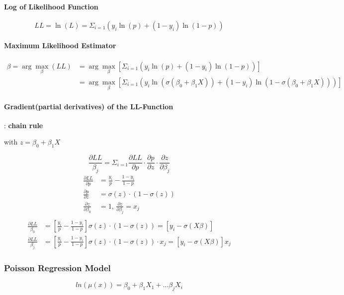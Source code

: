 \paragraph{Log of Likelihood Function}
$$LL = \ln(L) = \Sigma_{i=1} ( y_{i} \ln(p) + (1 - y_i)\ln(1-p))$$
\paragraph{Maximum Likelihood Estimator}
\begin{align*}
	\beta = \arg\max_{\beta}(LL) &= \arg\max_{\beta} [\Sigma_{i=1} ( y_{i} \ln(p) + (1 - y_i)\ln(1-p))] \\
	&= \arg\max_{\beta} [\Sigma_{i=1} ( y_{i} \ln(\sigma(\beta_0+\beta_1X)) + (1 - y_i)\ln(1-\sigma(\beta_0 + \beta_1X)))]
\end{align*}

\paragraph{Gradient(partial derivatives) of the LL-Function}: \textbf{chain rule}

with $z = \beta_0+\beta_1X$

$$\frac{\partial LL}{\beta_j} = \Sigma_{i=1} \frac{\partial LL}{\partial p} \cdot \frac{\partial p}{\partial z} \cdot \frac{\partial z}{\partial \beta_j}$$
\begin{align*}
	\frac{\partial LL}{\partial p} &= \frac{y_i}{p} - \frac{1 - y_i}{1 - p} \\
	\frac{\partial p}{\partial z} &= \sigma(z) \cdot(1 - \sigma(z)) \\
	\frac{\partial z}{\partial \beta_0} &= 1 \text{, } \frac{\partial z}{\partial \beta_j} = x_j\\		 
\end{align*}
\begin{align*}
	\frac{\partial LL}{\beta_0} &= \left[ \frac{y_i}{p} - \frac{1 - y_i}{1 - p}\right]  \sigma(z) \cdot(1 - \sigma(z)) = \left[ y_i - \sigma(X\beta) \right] \\
	\frac{\partial LL}{\beta_j} &= \left[ \frac{y_i}{p} - \frac{1 - y_i}{1 - p}\right]  \sigma(z) \cdot(1 - \sigma(z))\cdot x_j = \left[ y_i - \sigma(X\beta) \right] x_j
\end{align*}

\subsubsection{Poisson Regression Model}
$$ln(\mu(x)) = \beta_0 + \beta_1 X_1 + \dots \beta_j X_i$$

